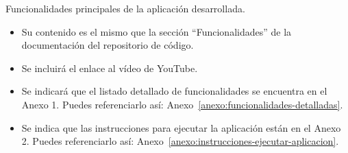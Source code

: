 
Funcionalidades principales de la aplicación desarrollada.


\begin{itemize}
    \item Su contenido es el mismo que la sección “Funcionalidades” de la documentación del repositorio de código.

    \item Se incluirá el enlace al vídeo de YouTube.

    \item Se indicará que el listado detallado de funcionalidades se encuentra en el Anexo 1. Puedes referenciarlo así: Anexo~\ref{anexo:funcionalidades-detalladas}.

    \item Se indica que las instrucciones para ejecutar la aplicación están en el Anexo 2. Puedes referenciarlo así: Anexo~\ref{anexo:instrucciones-ejecutar-aplicacion}.
\end{itemize}
